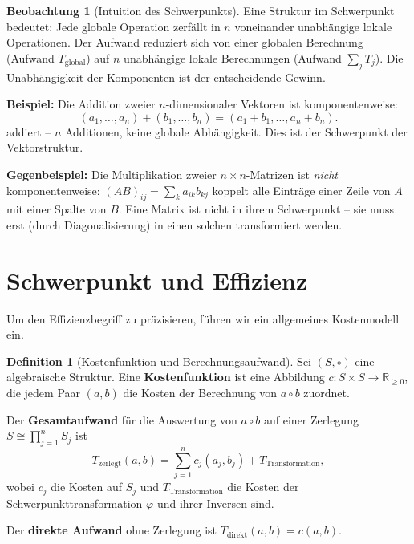 ﻿\documentclass[a4paper,12pt]{report}
\theoremstyle{definition}
\newtheorem{definition}{Definition}
\newtheorem{beobachtung}{Beobachtung}
\begin{document}
\begin{beobachtung}[Intuition des Schwerpunkts]
    Eine Struktur im Schwerpunkt bedeutet: Jede globale Operation
    zerfällt in $n$ voneinander unabhängige lokale Operationen.
    Der Aufwand reduziert sich von einer globalen Berechnung
    (Aufwand $T_{\mathrm{global}}$) auf $n$ unabhängige lokale
    Berechnungen (Aufwand $\sum_j T_j$). Die Unabhängigkeit der
    Komponenten ist der entscheidende Gewinn.

    \textbf{Beispiel:} Die Addition zweier $n$-di\-men\-sio\-na\-ler Vektoren
    ist komponentenweise:
    \[
        (a_1,\ldots,a_n) + (b_1,\ldots,b_n) = (a_1+b_1, \ldots, a_n+b_n).
    \]
    addiert -- $n$ Additionen, keine globale Abhängigkeit. Dies ist
    der Schwerpunkt der Vektorstruktur.

    \textbf{Gegenbeispiel:} Die Multiplikation zweier $n \times n$-Matrizen
    ist \emph{nicht} komponentenweise: $(AB)_{ij} = \sum_k a_{ik} b_{kj}$
    koppelt alle Einträge einer Zeile von $A$ mit einer Spalte von $B$.
    Eine Matrix ist nicht in ihrem Schwerpunkt -- sie muss erst
    (durch Diagonalisierung) in einen solchen transformiert werden.
\end{beobachtung}

\section{Schwerpunkt und Effizienz}

Um den Effizienzbegriff zu präzisieren, führen wir ein allgemeines
Kostenmodell ein.

\begin{definition}[Kostenfunktion und Berechnungsaufwand]
    Sei $(S, \circ)$ eine algebraische Struktur. Eine
    \textbf{Kostenfunktion} ist eine Abbildung $c : S \times S \to \mathbb{R}_{\geq 0}$,
    die jedem Paar $(a, b)$ die Kosten der Berechnung von $a \circ b$ zuordnet.

    Der \textbf{Gesamtaufwand} für die Auswertung von $a \circ b$ auf
    einer Zerlegung $S \cong \prod_{j=1}^n S_j$ ist
    \[
        T_{\mathrm{zerlegt}}(a, b)
        = \sum_{j=1}^n c_j(a_j, b_j) + T_{\mathrm{Transformation}},
    \]
    wobei $c_j$ die Kosten auf $S_j$ und $T_{\mathrm{Transformation}}$
    die Kosten der Schwerpunkttransformation $\varphi$ und ihrer
    Inversen sind.

    Der \textbf{direkte Aufwand} ohne Zerlegung ist
    $T_{\mathrm{direkt}}(a, b) = c(a, b)$.
\end{definition}
\end{document}

